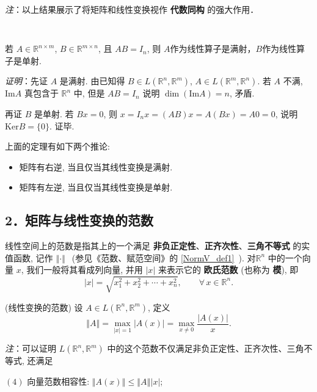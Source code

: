 \textsl{注}：以上结果展示了将矩阵和线性变换视作 \textbf{代数同构} 的强大作用．

\verb| |

\begin{theorem}{}
若 $A\in\mathbb{R}^{n\times m}$, $B\in\mathbb{R}^{m\times n}$, 且 $AB=I_n$, 则 $A$作为线性算子是满射，$B$作为线性算子是单射.

\textsl{证明}：先证 $A$ 是满射. 由已知得 $B\in L(\mathbb{R}^{n},\mathbb{R}^{m})$, $A\in L(\mathbb{R}^{m},\mathbb{R}^{n})$.
若 $A$ 不满, $\mathrm{Im}A$ 真包含于 $\mathbb{R}^{n}$ 中, 但是 $AB=I_{n}$
说明 $\dim(\mathrm{Im}A)=n$, 矛盾. 

再证 $B$ 是单射. 若 $Bx=0$, 则 $x=I_{n}x=(AB)x=A(Bx)=A0=0$, 说明 $\mathrm{Ker}B=\{0\}$.
证毕. 
\end{theorem}

上面的定理有如下两个推论:

\begin{itemize}
\item 矩阵有右逆, 当且仅当其线性变换是满射. \end{itemize}

\begin{itemize}
\item 矩阵有左逆, 当且仅当其线性变换是单射. 
\end{itemize}




\subsection{2．矩阵与线性变换的范数}
线性空间上的范数是指其上的一个满足 \textbf{非负正定性}、\textbf{正齐次性}、\textbf{三角不等式} 的实值函数, 记作 $\left\Vert \cdot\right\Vert ~~$ 
(参见《范数、赋范空间》的 \autoref{NormV_def1}~). 对$\mathbb{R}^n$ 中的一个向量 $x$, 我们一般将其看成列向量, 并用 $|x|$ 来表示它的 \textbf{欧氏范数} (也称为 \textbf{模}), 即
$$ |x|=\sqrt{x_1^2+x^2_2+\cdots+x_n^2}, \qquad\forall \,x\in \mathbb{R}^n. 
$$

\begin{definition}{(线性变换的范数)}
设 $A\in L(\mathbb{R}^{n},\mathbb{R}^{m})$, 定义
\[
\left\Vert A\right\Vert =\max_{|x|=1}|A(x)|=\max_{x\neq0}{\displaystyle \frac{|A(x)|}{x}}.
\]
\end{definition}
\textsl{注}：可以证明 $L(\mathbb{R}^{n},\mathbb{R}^{m})$ 中的这个范数不仅满足非负正定性、正齐次性、三角不等式,
还满足

$(4)$ 向量范数相容性: $\left\Vert A(x)\right\Vert \leqslant\left\Vert A\right\Vert \left|x\right|$;

